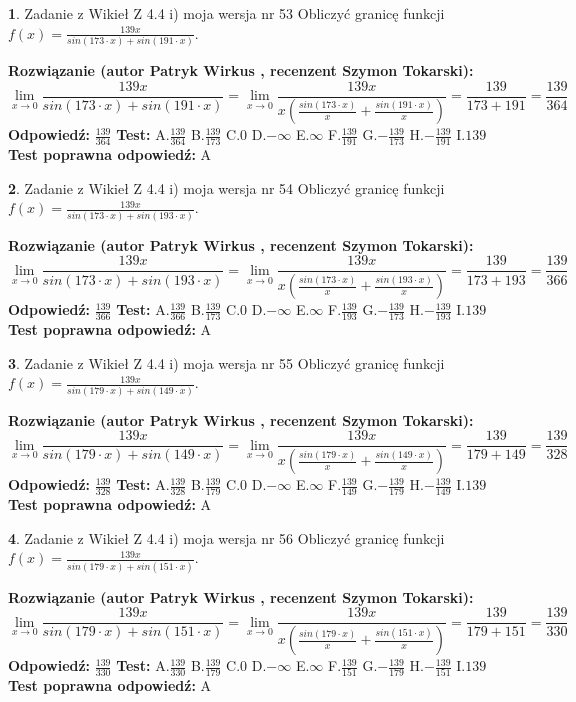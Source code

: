 \documentclass[12pt, a4paper]{article}
\theoremstyle{definition} %
\newtheorem{zad}{}
\newcommand{\zadStart}[1]{\begin{zad}#1\newline}
\newcommand{\zadStop}{\end{zad}}
\newcommand{\rozwStart}[2]{\noindent \textbf{Rozwiązanie (autor #1 , recenzent #2): }\newline}
\newcommand{\rozwStop}{\newline}
\newcommand{\odpStart}{\noindent \textbf{Odpowiedź:}\newline}
\newcommand{\odpStop}{\newline}
\newcommand{\testStart}{\noindent \textbf{Test:}\newline}
\newcommand{\testStop}{\newline}
\newcommand{\kluczStart}{\noindent \textbf{Test poprawna odpowiedź:}\newline}
\newcommand{\kluczStop}{\newline}
\begin{document}
\zadStart{Zadanie z Wikieł Z 4.4 i) moja wersja nr 53}
Obliczyć granicę funkcji $f(x)=\frac{139x}{sin(173\cdot x) +sin(191\cdot x)}$.
\zadStop
\rozwStart{Patryk Wirkus}{Szymon Tokarski}
$$\lim\limits_{x\to 0}\frac{139x}{sin(173\cdot x) +sin(191\cdot x)}=\lim\limits_{x\to 0}\frac{139x}{x(\frac{sin(173\cdot x)}{x}+\frac{sin(191\cdot x)}{x})}=\frac{139}{173+191} = \frac{139}{364}$$
\rozwStop
\odpStart
$\frac{139}{364}$
\odpStop
\testStart
A.$\frac{139}{364}$
B.$\frac{139}{173}$
C.$0$
D.$-\infty$
E.$\infty$
F.$\frac{139}{191}$
G.$-\frac{139}{173}$
H.$-\frac{139}{191}$
I.$139$
\testStop
\kluczStart
A
\kluczStop



\zadStart{Zadanie z Wikieł Z 4.4 i) moja wersja nr 54}
Obliczyć granicę funkcji $f(x)=\frac{139x}{sin(173\cdot x) +sin(193\cdot x)}$.
\zadStop
\rozwStart{Patryk Wirkus}{Szymon Tokarski}
$$\lim\limits_{x\to 0}\frac{139x}{sin(173\cdot x) +sin(193\cdot x)}=\lim\limits_{x\to 0}\frac{139x}{x(\frac{sin(173\cdot x)}{x}+\frac{sin(193\cdot x)}{x})}=\frac{139}{173+193} = \frac{139}{366}$$
\rozwStop
\odpStart
$\frac{139}{366}$
\odpStop
\testStart
A.$\frac{139}{366}$
B.$\frac{139}{173}$
C.$0$
D.$-\infty$
E.$\infty$
F.$\frac{139}{193}$
G.$-\frac{139}{173}$
H.$-\frac{139}{193}$
I.$139$
\testStop
\kluczStart
A
\kluczStop



\zadStart{Zadanie z Wikieł Z 4.4 i) moja wersja nr 55}
Obliczyć granicę funkcji $f(x)=\frac{139x}{sin(179\cdot x) +sin(149\cdot x)}$.
\zadStop
\rozwStart{Patryk Wirkus}{Szymon Tokarski}
$$\lim\limits_{x\to 0}\frac{139x}{sin(179\cdot x) +sin(149\cdot x)}=\lim\limits_{x\to 0}\frac{139x}{x(\frac{sin(179\cdot x)}{x}+\frac{sin(149\cdot x)}{x})}=\frac{139}{179+149} = \frac{139}{328}$$
\rozwStop
\odpStart
$\frac{139}{328}$
\odpStop
\testStart
A.$\frac{139}{328}$
B.$\frac{139}{179}$
C.$0$
D.$-\infty$
E.$\infty$
F.$\frac{139}{149}$
G.$-\frac{139}{179}$
H.$-\frac{139}{149}$
I.$139$
\testStop
\kluczStart
A
\kluczStop



\zadStart{Zadanie z Wikieł Z 4.4 i) moja wersja nr 56}
Obliczyć granicę funkcji $f(x)=\frac{139x}{sin(179\cdot x) +sin(151\cdot x)}$.
\zadStop
\rozwStart{Patryk Wirkus}{Szymon Tokarski}
$$\lim\limits_{x\to 0}\frac{139x}{sin(179\cdot x) +sin(151\cdot x)}=\lim\limits_{x\to 0}\frac{139x}{x(\frac{sin(179\cdot x)}{x}+\frac{sin(151\cdot x)}{x})}=\frac{139}{179+151} = \frac{139}{330}$$
\rozwStop
\odpStart
$\frac{139}{330}$
\odpStop
\testStart
A.$\frac{139}{330}$
B.$\frac{139}{179}$
C.$0$
D.$-\infty$
E.$\infty$
F.$\frac{139}{151}$
G.$-\frac{139}{179}$
H.$-\frac{139}{151}$
I.$139$
\testStop
\kluczStart
A
\kluczStop
\end{document}
